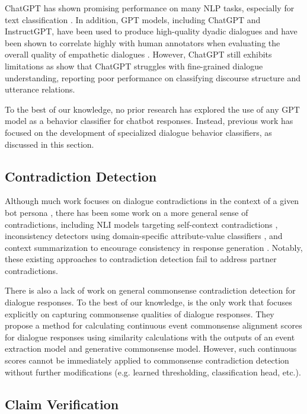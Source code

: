 ChatGPT has shown promising performance on many NLP tasks, especially for text classification \cite{gilardi:23, kocon:23, zhu:23}. In addition, GPT models, including ChatGPT and InstructGPT, have been used to produce high-quality dyadic dialogues \cite{kim:22, zhan:23} and have been shown to correlate highly with human annotators when evaluating the overall quality of empathetic dialogues \cite{svikhnushina:23}. However, ChatGPT still exhibits limitations as \citet{chan:23} show that ChatGPT struggles with fine-grained dialogue understanding, reporting poor performance on classifying discourse structure and utterance relations. 

To the best of our knowledge, no prior research has explored the use of any GPT model as a behavior classifier for chatbot responses. Instead, previous work has focused on the development of specialized dialogue behavior classifiers, as discussed in this section.

\subsection{Contradiction Detection}
\label{sec:rw_speaker_contradiction}

Although much work focuses on dialogue contradictions in the context of a given bot persona \cite{zhang:18, welleck:19, kim:20, song:20, shuster:22}, there has been some work on a more general sense of contradictions, including NLI models targeting self-context contradictions \cite{li:21, nie:21}, inconsistency detectors using domain-specific attribute-value classifiers \cite{shi:21}, and context summarization to encourage consistency in response generation \cite{xu_beyond:22, xu_long:22}. Notably, these existing approaches to contradiction detection fail to address partner contradictions.

There is also a lack of work on general commonsense contradiction detection for dialogue responses. To the best of our knowledge, \citet{ghazarian:23} is the only work that focuses explicitly on capturing commonsense qualities of dialogue responses. They propose a method for calculating continuous event commonsense alignment scores for dialogue responses using similarity calculations with the outputs of an event extraction model and generative commonsense model. However, such continuous scores cannot be immediately applied to commonsense contradiction detection without further modifications (e.g. learned thresholding, classification head, etc.).

\subsection{Claim Verification}
\label{sec:rw_claim_verification}

